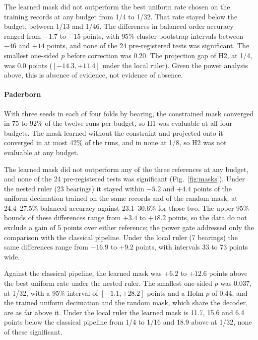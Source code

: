 The learned mask did not outperform the best uniform rate chosen on the training records at any
budget from 1/4 to 1/32. That rate stayed below the budget, between 1/13 and 1/46. The differences
in balanced order accuracy ranged from $-1.7$ to $-15$ points, with 95\% cluster-bootstrap intervals
between $-46$ and $+14$ points, and none of the 24 pre-registered tests was significant. The
smallest one-sided $p$ before correction was 0.20. The projection gap of H2, at 1/4, was 0.0 points
($[-14.3, +11.4]$ under the local ruler). Given the power analysis above, this is absence of
evidence, not evidence of absence.

\paragraph{Paderborn} With three seeds in each of four folds by bearing, the constrained mask
converged in 75 to 92\% of the twelve runs per budget, so H1 was evaluable at all four budgets.
The mask learned without the constraint and projected onto it converged in at most 42\% of the
runs, and in none at 1/8, so H2 was not evaluable at any budget.

The learned mask did not outperform any of the three references at any budget, and none of the 24
pre-registered tests was significant (Fig.~\ref{fig:masks}). Under the nested ruler (23 bearings)
it stayed within $-5.2$ and $+4.4$ points of the uniform decimation trained on the same records and
of the random mask, at 24.4--27.5\% balanced accuracy against 23.1--30.6\% for those two. The upper
95\% bounds of these differences range from $+3.4$ to $+18.2$ points, so the data do not exclude a
gain of 5 points over either reference; the power gate addressed only the comparison with the
classical pipeline. Under the local ruler (7 bearings) the same differences range from $-16.9$ to
$+9.2$ points, with intervals 33 to 73 points wide.

Against the classical pipeline, the learned mask was $+6.2$ to $+12.6$ points above the best uniform
rate under the nested ruler. The smallest one-sided $p$ was 0.037, at 1/32, with a 95\% interval of
$[-1.1, +28.2]$ points and a Holm $p$ of 0.44, and the trained uniform decimation and the random
mask, which share the decoder, are as far above it. Under the local ruler the learned mask is 11.7,
15.6 and 6.4 points below the classical pipeline from 1/4 to 1/16 and 18.9 above at 1/32, none of
these significant.


